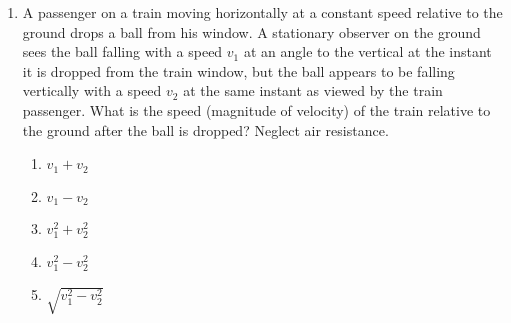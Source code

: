 \documentclass{../../oss-apphys}
\begin{document}
\begin{multicols}{2}
\begin{enumerate}[resume,leftmargin=18pt]
    \columnbreak
      
  \item A passenger on a train moving horizontally at a constant speed
    relative to the ground drops a ball from his window. A stationary
    observer on the ground sees the ball falling with a speed $v_1$ at an
    angle to the vertical at the instant it is dropped from the train window,
    but the ball appears to be falling vertically with a speed $v_2$ at the
    same instant as viewed by the train passenger. What is the speed
    (magnitude of velocity) of the train relative to the ground after the
    ball is dropped? Neglect air resistance.
    \begin{enumerate}[noitemsep,topsep=0pt,leftmargin=18pt,label=(\Alph*)]
    \item $ v_1 + v_2$
    \item $ v_1 - v_2$
    \item $ v_1^2 + v_2^2$
    \item $ v_1^2 - v_2^2$
    \item $\sqrt{v_1^2 - v_2^2}$
    \end{enumerate}
      
      

\end{enumerate}
\end{multicols}
\end{document}
